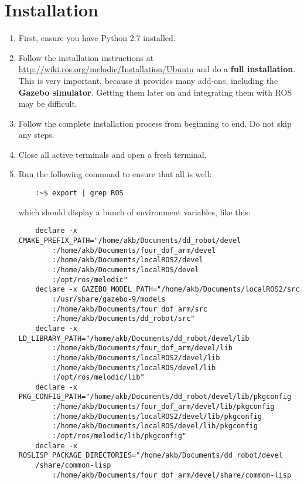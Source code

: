 \documentclass{article}
\begin{document}
    \section{Installation}
        \begin{enumerate}
            \item First, ensure you have Python 2.7 installed.
            \item Follow the installation instructions at \url{http://wiki.ros.org/melodic/Installation/Ubuntu}
            and do a \textbf{full installation}. This is very important, because it provides 
            many add-ons, including the \textbf{Gazebo simulator}. Getting them 
            later on and integrating them with ROS may be difficult.
            \item Follow the complete installation process from beginning to end. Do not skip any steps.
            \item Close all active terminals and open a fresh terminal.
            \item Run the following command to ensure that all is well:
            \begin{verbatim}
    :~$ export | grep ROS
            \end{verbatim}
            which should display a bunch of environment variables, like this:
            \begin{verbatim}
    declare -x CMAKE_PREFIX_PATH="/home/akb/Documents/dd_robot/devel
        :/home/akb/Documents/four_dof_arm/devel
        :/home/akb/Documents/localROS2/devel
        :/home/akb/Documents/localROS/devel
        :/opt/ros/melodic"
    declare -x GAZEBO_MODEL_PATH="/home/akb/Documents/localROS2/src
        :/usr/share/gazebo-9/models
        :/home/akb/Documents/four_dof_arm/src
        :/home/akb/Documents/dd_robot/src"
    declare -x LD_LIBRARY_PATH="/home/akb/Documents/dd_robot/devel/lib
        :/home/akb/Documents/four_dof_arm/devel/lib
        :/home/akb/Documents/localROS2/devel/lib
        :/home/akb/Documents/localROS/devel/lib
        :/opt/ros/melodic/lib"
    declare -x PKG_CONFIG_PATH="/home/akb/Documents/dd_robot/devel/lib/pkgconfig
        :/home/akb/Documents/four_dof_arm/devel/lib/pkgconfig
        :/home/akb/Documents/localROS2/devel/lib/pkgconfig
        :/home/akb/Documents/localROS/devel/lib/pkgconfig
        :/opt/ros/melodic/lib/pkgconfig"
    declare -x ROSLISP_PACKAGE_DIRECTORIES="/home/akb/Documents/dd_robot/devel
    /share/common-lisp
        :/home/akb/Documents/four_dof_arm/devel/share/common-lisp

\end{verbatim}
\end{enumerate}
\end{document}
